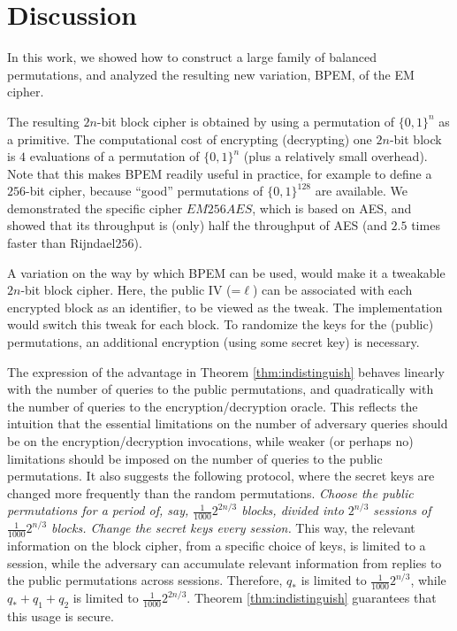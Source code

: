 \documentclass{llncs}
\newcommand{\s}{\{0,1\}}
\begin{document}
\section{Discussion}\label{sec:discussion}

In this work, we showed how to construct a large family of balanced permutations, and analyzed the resulting new variation, BPEM, of the EM cipher. 

The resulting $2n$-bit block cipher is obtained by using a permutation of $\s^n$ as a primitive.
The computational cost of encrypting (decrypting) one $2n$-bit block is $4$ evaluations of a permutation of $\s^n$ (plus a relatively small overhead).
Note that this makes BPEM readily useful in practice, for example to define a $256$-bit cipher, because ``good'' permutations of $\{0, 1\}^{128}$ are available. We demonstrated the specific cipher $EM256AES$, which is based on AES, and showed that its throughput is (only) half the throughput of AES (and $2.5$ times faster than Rijndael256).

A variation on the way by which BPEM can be used, would make it a tweakable $2n$-bit block cipher. Here, the public IV (=$\ell$) can be associated with each encrypted block as an identifier, to be viewed as the tweak. The implementation would switch this tweak for each block. To randomize the keys for the (public) permutations, an additional encryption (using some secret key) is necessary.

The expression of the advantage in Theorem \ref{thm:indistinguish} behaves linearly with the number of queries to the public permutations, and quadratically with the number of queries to the encryption/decryption oracle.
This reflects the intuition that the essential limitations on the number of adversary queries should be on the encryption/decryption invocations, while weaker (or perhaps no) limitations should be imposed on the number of queries to the public permutations. 
It also suggests the following protocol, where the secret keys are changed more frequently than the random permutations.
{\it 
Choose the public permutations for a period of, say, $\frac{1}{1000}2^{2n/3}$ blocks, divided into $2^{n/3}$ sessions of $\frac{1}{1000}2^{n/3}$ blocks. Change the secret keys every session.}
This way, the relevant information on the block cipher, from a specific choice of keys, is limited to a session, while the adversary can accumulate relevant information from replies to the public permutations across sessions. Therefore, $q_{*}$ is limited to $\frac{1}{1000}2^{n/3}$, while $q_{*}+q_1+q_2$ is limited to $\frac{1}{1000}2^{2n/3}$. Theorem \ref{thm:indistinguish} guarantees that this usage is secure.
\end{document}
